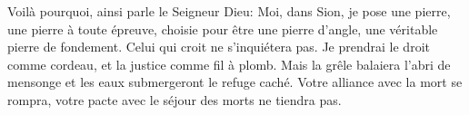 Voilà pourquoi, ainsi parle le Seigneur Dieu:
	Moi, dans Sion, je pose une pierre, une pierre à toute épreuve,
	choisie pour être une pierre d’angle, une véritable pierre de fondement.
Celui qui croit ne s’inquiétera pas.
	Je prendrai le droit comme cordeau, et la justice comme fil à plomb.
Mais la grêle balaiera l’abri de mensonge
	et les eaux submergeront le refuge caché.
Votre alliance avec la mort se rompra,
	votre pacte avec le séjour des morts ne tiendra pas.
